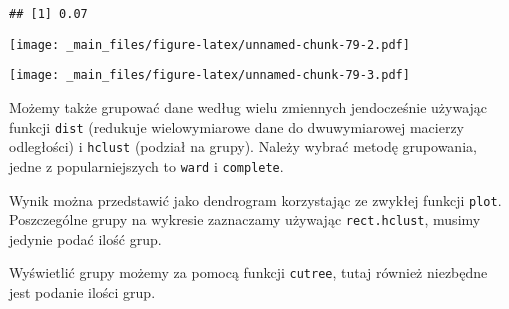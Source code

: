 \documentclass[
]{book}
\newenvironment{Shaded}{\begin{snugshade}}{\end{snugshade}}
\newcommand{\AttributeTok}[1]{\textcolor[rgb]{0.77,0.63,0.00}{#1}}
\newcommand{\CommentTok}[1]{\textcolor[rgb]{0.56,0.35,0.01}{\textit{#1}}}
\newcommand{\DecValTok}[1]{\textcolor[rgb]{0.00,0.00,0.81}{#1}}
\newcommand{\FunctionTok}[1]{\textcolor[rgb]{0.00,0.00,0.00}{#1}}
\newcommand{\NormalTok}[1]{#1}
\newcommand{\OtherTok}[1]{\textcolor[rgb]{0.56,0.35,0.01}{#1}}
\newcommand{\SpecialCharTok}[1]{\textcolor[rgb]{0.00,0.00,0.00}{#1}}
\begin{document}
\begin{verbatim}
## [1] 0.07
\end{verbatim}

\begin{Shaded}
\end{Shaded}

\texttt{[image: \_main\_files/figure-latex/unnamed-chunk-79-2.pdf]}

\begin{Shaded}
\end{Shaded}

\texttt{[image: \_main\_files/figure-latex/unnamed-chunk-79-3.pdf]}

Możemy także grupować dane według wielu zmiennych jendocześnie używając funkcji \texttt{dist} (redukuje wielowymiarowe dane do dwuwymiarowej macierzy odległości) i \texttt{hclust} (podział na grupy). Należy wybrać metodę grupowania, jedne z popularniejszych to \texttt{ward} i \texttt{complete}.

Wynik można przedstawić jako dendrogram korzystając ze zwykłej funkcji \texttt{plot}. Poszczególne grupy na wykresie zaznaczamy używając \texttt{rect.hclust}, musimy jedynie podać ilość grup.

Wyświetlić grupy możemy za pomocą funkcji \texttt{cutree}, tutaj również niezbędne jest podanie ilości grup.
\end{document}
